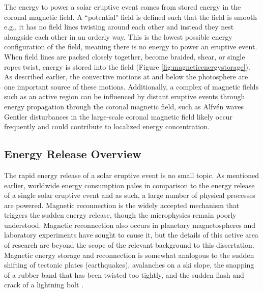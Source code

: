 The energy to power a solar eruptive event comes from stored energy in the coronal magnetic field. A ``potential" field is defined such that the field is smooth e.g., it has no field lines twisting around each other and instead they nest alongside each other in an orderly way. This is the lowest possible energy configuration of the field, meaning there is no energy to power an eruptive event. When field lines are packed closely together, become braided, shear, or single ropes twist, energy is stored into the field (Figure \ref{fig:magneticenergystorage}). As described earlier, the convective motions at and below the photosphere are one important source of these motions. Additionally, a complex of magnetic fields such as an active region can be influenced by distant eruptive events through energy propagation through the coronal magnetic field, such as Alfvén waves \citep{Schrijver2011}. Gentler disturbances in the large-scale coronal magnetic field likely occur frequently and could contribute to localized energy concentration. 

\subsection{Energy Release Overview}
The rapid energy release of a solar eruptive event is no small topic. As mentioned earlier, worldwide energy consumption pales in comparison to the energy release of a single solar eruptive event and as such, a large number of physical processes are powered. Magnetic reconnection is the widely accepted mechanism that triggers the sudden energy release, though the microphysics remain poorly understood. Magnetic reconnection also occurs in planetary magnetospheres and laboratory experiments have sought to cause it, but the details of this active area of research are beyond the scope of the relevant background to this dissertation. Magnetic energy storage and reconnection is somewhat analogous to the sudden shifting of tectonic plates (earthquakes), avalanches on a ski slope, the snapping of a rubber band that has been twisted too tightly, and the sudden flash and crack of a lightning bolt \citep{Lang2001}. 

